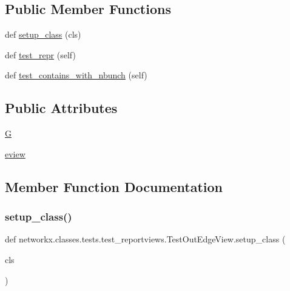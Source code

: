 \subsection*{Public Member Functions}
\begin{DoxyCompactItemize}
\item 
def \hyperlink{classnetworkx_1_1classes_1_1tests_1_1test__reportviews_1_1TestOutEdgeView_aaabd08b7843aede6d6476d6c0409a838}{setup\+\_\+class} (cls)
\item 
def \hyperlink{classnetworkx_1_1classes_1_1tests_1_1test__reportviews_1_1TestOutEdgeView_ae1899e41a62d3f3c78b88dcc4adc8fe0}{test\+\_\+repr} (self)
\item 
def \hyperlink{classnetworkx_1_1classes_1_1tests_1_1test__reportviews_1_1TestOutEdgeView_a5dce55677380b7918b8239b858a887ac}{test\+\_\+contains\+\_\+with\+\_\+nbunch} (self)
\end{DoxyCompactItemize}
\subsection*{Public Attributes}
\begin{DoxyCompactItemize}
\item 
\hyperlink{classnetworkx_1_1classes_1_1tests_1_1test__reportviews_1_1TestOutEdgeView_a3e110a8db067ee9ba97d88fa6b2ffce0}{G}
\item 
\hyperlink{classnetworkx_1_1classes_1_1tests_1_1test__reportviews_1_1TestOutEdgeView_aa7266bedb5ec0e53e9cf7dc28fcea385}{eview}
\end{DoxyCompactItemize}


\subsection{Member Function Documentation}
\mbox{\label{classnetworkx_1_1classes_1_1tests_1_1test__reportviews_1_1TestOutEdgeView_aaabd08b7843aede6d6476d6c0409a838}} 
\subsubsection{\texorpdfstring{setup\+\_\+class()}{setup\_class()}}
{\footnotesize\ttfamily def networkx.\+classes.\+tests.\+test\+\_\+reportviews.\+Test\+Out\+Edge\+View.\+setup\+\_\+class (\begin{DoxyParamCaption}\item[{}]{cls }\end{DoxyParamCaption})}

